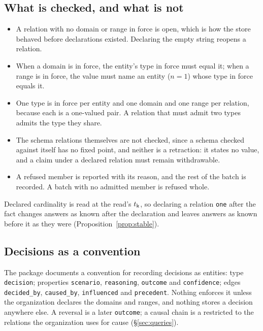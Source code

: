 \subsection{What is checked, and what is not}

\begin{itemize}[leftmargin=*,itemsep=2pt]
\item A relation with no domain or range in force is open, which is how the
  store behaved before declarations existed. Declaring the empty string reopens
  a relation.
\item When a domain is in force, the entity's type in force must equal it; when
  a range is in force, the value must name an entity ($n = 1$) whose type in
  force equals it.
\item One type is in force per entity and one domain and one range per relation,
  because each is a one-valued pair. A relation that must admit two types admits
  the type they share.
\item The schema relations themselves are not checked, since a schema checked
  against itself has no fixed point, and neither is a retraction: it states no
  value, and a claim under a declared relation must remain withdrawable.
\item A refused member is reported with its reason, and the rest of the batch is
  recorded. A batch with no admitted member is refused whole.
\end{itemize}

Declared cardinality is read at the read's $t_{\mathrm{k}}$, so declaring a relation
\texttt{one} after the fact changes answers as known after the declaration and
leaves answers as known before it as they were (Proposition~\ref{prop:stable}).

\subsection{Decisions as a convention}

The package documents a convention for recording decisions as entities: type
\texttt{decision}; properties \texttt{scenario}, \texttt{reasoning},
\texttt{outcome} and \texttt{confidence}; edges \texttt{decided\_by},
\texttt{caused\_by}, \texttt{influenced} and \texttt{precedent}. Nothing
enforces it unless the organization declares the domains and ranges, and
nothing stores a decision anywhere else. A reversal is a later
\texttt{outcome}; a causal chain is a  restricted to the relations the
organization uses for cause (\S\ref{sec:queries}).
